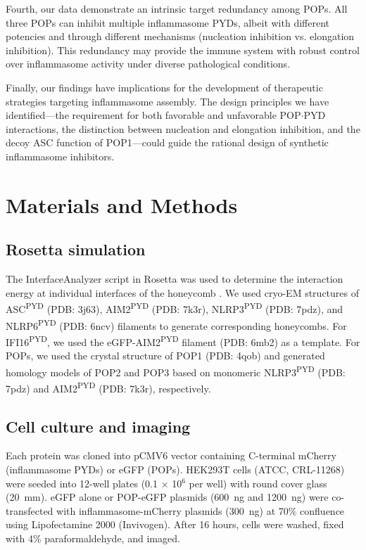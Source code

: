 \documentclass[11pt]{article}
\begin{document}
Fourth, our data demonstrate an intrinsic target redundancy among POPs. All three POPs can inhibit multiple inflammasome PYDs, albeit with different potencies and through different mechanisms (nucleation inhibition vs. elongation inhibition). This redundancy may provide the immune system with robust control over inflammasome activity under diverse pathological conditions.

Finally, our findings have implications for the development of therapeutic strategies targeting inflammasome assembly. The design principles we have identified---the requirement for both favorable and unfavorable POP$\cdot$PYD interactions, the distinction between nucleation and elongation inhibition, and the decoy ASC function of POP1---could guide the rational design of synthetic inflammasome inhibitors.

\section{Materials and Methods}

\subsection{Rosetta simulation}
The InterfaceAnalyzer script in Rosetta was used to determine the interaction energy at individual interfaces of the honeycomb \citep{matyszewski2021directionality}. We used cryo-EM structures of ASC\textsuperscript{PYD} (PDB: 3j63), AIM2\textsuperscript{PYD} (PDB: 7k3r), NLRP3\textsuperscript{PYD} (PDB: 7pdz), and NLRP6\textsuperscript{PYD} (PDB: 6ncv) filaments to generate corresponding honeycombs. For IFI16\textsuperscript{PYD}, we used the eGFP-AIM2\textsuperscript{PYD} filament (PDB: 6mb2) as a template. For POPs, we used the crystal structure of POP1 (PDB: 4qob) and generated homology models of POP2 and POP3 based on monomeric NLRP3\textsuperscript{PYD} (PDB: 7pdz) and AIM2\textsuperscript{PYD} (PDB: 7k3r), respectively.

\subsection{Cell culture and imaging}
Each protein was cloned into pCMV6 vector containing C-terminal mCherry (inflammasome PYDs) or eGFP (POPs). HEK293T cells (ATCC, CRL-11268) were seeded into 12-well plates (0.1 $\times$ 10$^6$ per well) with round cover glass (20~mm). eGFP alone or POP-eGFP plasmids (600~ng and 1200~ng) were co-transfected with inflammasome-mCherry plasmids (300~ng) at 70\% confluence using Lipofectamine 2000 (Invivogen). After 16 hours, cells were washed, fixed with 4\% paraformaldehyde, and imaged.
\end{document}
